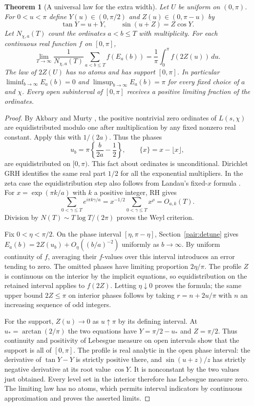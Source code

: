 \documentclass[11pt,letterpaper]{article}
\newtheorem{theorem}{Theorem}[section]
\theoremstyle{remark}\newtheorem{remark}[theorem]{Remark}
\begin{document}
\begin{theorem}[A universal law for the extra width]\label{pair:limit}
Let $U$ be uniform on $(0,\pi)$. For $0<u<\pi$ define
$Y(u)\in(0,\pi/2)$ and $Z(u)\in(0,\pi-u)$ by
\[
 \tan Y=u+Y,\qquad \sin(u+Z)=Z\cos Y .
\]
Let $N_{\chi,a}(T)$ count the ordinates $a<b\le T$ with multiplicity.
For each continuous real function $f$ on $[0,\pi]$,
\[
 \lim_{T\to\infty}\frac{1}{N_{\chi,a}(T)}
       \sum_{a<b\le T} f(E_a(b))
       =\frac1\pi\int_0^\pi f(2Z(u))\,du .
\]
The law of $2Z(U)$ has no atoms and has support $[0,\pi]$.
In particular $\liminf_{b\to\infty} E_a(b)=0$ and
$\limsup_{b\to\infty} E_a(b)=\pi$ for every fixed choice of $a$ and
$\chi$. Every open subinterval of $[0,\pi]$ receives a positive
limiting fraction of the ordinates.
\end{theorem}
\begin{proof}
By Akbary and Murty \cite[Corollary~8]{AM}, the positive nontrivial zero
ordinates of $L(s,\chi)$ are equidistributed modulo one after
multiplication by any fixed nonzero real constant. Apply this with
$1/(2a)$. Thus the phases
\[
 u_b=\pi\left\{\frac{b}{2a}-\frac12\right\},\qquad
 \{x\}=x-\lfloor x\rfloor ,
\]
are equidistributed on $[0,\pi)$. This fact about ordinates is
unconditional. Dirichlet GRH identifies the same real part $1/2$ for
all the exponential multipliers. In the zeta case the equidistribution
step also follows from Landau's fixed-$x$ formula
\cite{Landau,FSZ}. For $x=\exp(\pi k/a)$ with $k$ a positive integer,
RH gives
\[
 \sum_{0<\gamma\le T} e^{i\pi k\gamma/a}
 =x^{-1/2}\!\sum_{0<\gamma\le T} x^{\rho}=O_{a,k}(T).
\]
Division by $N(T)\sim T\log T/(2\pi)$ proves the Weyl criterion.

Fix $0<\eta<\pi/2$. On the phase interval
$[\eta,\pi-\eta]$, Section~\ref{pair:detune} gives
$E_a(b)=2Z(u_b)+O_\eta((b/a)^{-2})$ uniformly as $b\to\infty$.
By uniform continuity of $f$, averaging their $f$-values over this
interval introduces an error tending to zero. The omitted phases have
limiting proportion $2\eta/\pi$. The profile $Z$ is continuous on the
interior by the implicit equations, so equidistribution on the retained
interval applies to $f(2Z)$. Letting $\eta\downarrow0$ proves the
formula; the same upper bound $2Z\le\pi$ on interior phases follows by
taking $r=n+2u/\pi$ with $n$ an increasing sequence of odd integers.

For the support, $Z(u)\to0$ as $u\uparrow\pi$ by its defining
interval. At $u_* = \arctan(2/\pi)$ the two equations have
$Y=\pi/2-u_*$ and $Z=\pi/2$. Thus continuity and positivity of
Lebesgue measure on open intervals show that the support is all of
$[0,\pi]$. The profile is real analytic in the open phase interval:
the derivative of $\tan Y-Y$ is strictly positive there, and
$\sin(u+z)/z$ has strictly negative derivative at its root
value $\cos Y$. It is nonconstant by the two values just obtained.
Every level set in the interior therefore has Lebesgue measure zero.
The limiting law has no atoms, which permits interval indicators by
continuous approximation and proves the asserted limits.
\end{proof}
\end{document}
